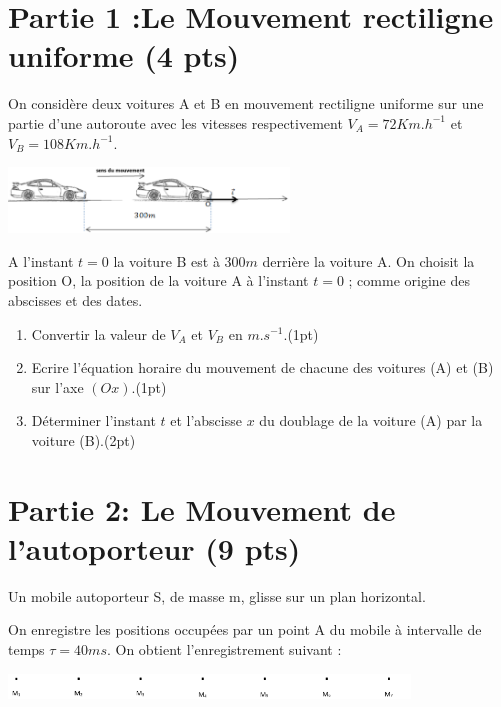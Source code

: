 \documentclass[12pt]{article}
\begin{document}
\section*{Partie 1 :Le Mouvement rectiligne uniforme \dotfill(4 pts)}
On considère deux voitures A et B en mouvement rectiligne uniforme sur une partie d’une autoroute avec les vitesses respectivement $V_A=72Km.h^{-1}$ et $V_B=108Km.h^{-1}$.
\begin{center}
	\includegraphics[width=0.56\textwidth]{./img/ex1.png}
\end{center}


A l’instant $t=0$ la voiture B est à $300m$ derrière la voiture A.
On choisit la position O, la position de la voiture A à l’instant $t=0$ ; comme origine des abscisses et des dates.

\begin{enumerate}
	\item  Convertir la valeur de $V_A$ et $V_B$ en $m.s^{-1}$.\dotfill(1pt)
	\item Ecrire l’équation horaire du mouvement de chacune des voitures (A) et (B) sur l’axe $(Ox)$.\dotfill(1pt)
	\item  Déterminer l’instant $t$ et l’abscisse $x$ du doublage de la voiture (A) par la voiture (B).\dotfill(2pt)
\end{enumerate}

\section*{Partie 2: Le Mouvement de l'autoporteur \dotfill(9 pts)}
Un mobile autoporteur S, de masse m, glisse sur un plan horizontal.

On enregistre les positions occupées par un point A du mobile à intervalle de temps $\tau = 40 ms$. On obtient l’enregistrement suivant :
\begin{center}
	\includegraphics[width=0.8\textwidth]{./img/ex2.png}
\end{center}
\end{document}
